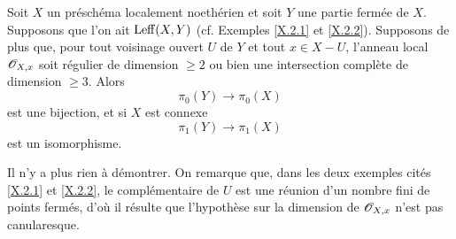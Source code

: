 \begin{theoreme} \label{X.3.10}
Soit $X$ un pr\'esch\'ema localement noeth\'erien et soit $Y$ une partie ferm\'ee de $X$. Supposons que l'on ait $\operatorname{Leff}(X, Y)$ (cf. Exemples \ref{X.2.1} et \ref{X.2.2}). Supposons de plus que, pour tout voisinage ouvert $U$ de $Y$ et tout $x\in X-U$, l'anneau local ${\mathscr O}_{X, x}$ soit r\'egulier de dimension $\geq2$ ou bien une intersection compl\`ete de dimension $\geq3$. Alors
\[
\pi_0(Y) \to \pi_0(X)
\]
est une bijection, et si $X$ est connexe
\[
\pi_1(Y) \to \pi_1(X)
\]
est un isomorphisme.
\end{theoreme}

Il n'y a plus rien \`a d\'emontrer. On remarque que, dans les deux exemples cit\'es \ref{X.2.1} et \ref{X.2.2}, le compl\'ementaire de $U$ est une r\'eunion d'un nombre fini de points ferm\'es, d'o\`u il r\'esulte que l'hypoth\`ese sur la dimension de ${\mathscr O}_{X, x}$ n'est pas canularesque.

\makeatletter{}\makeatother{}

